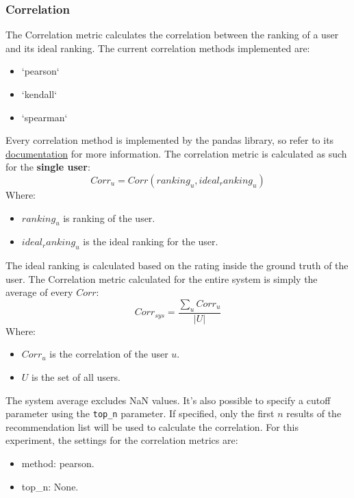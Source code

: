 \documentclass[11pt]{article}
\begin{document}
\subsubsection{Correlation}\label{subsubsec:corr}
The Correlation metric calculates the correlation between the ranking of a user and its ideal ranking.
The current correlation methods implemented are:
\begin{itemize}
    \item `pearson`
    \item `kendall`
    \item `spearman`
\end{itemize}
\hfill\break
\hfill\break
Every correlation method is implemented by the pandas library, so refer to its
\href{https://pandas.pydata.org/docs/reference/api/pandas.Series.corr.html}{documentation} for more information.
\hfill\break
\hfill\break
The correlation metric is calculated as such for the \textbf{single user}:
\hfill\break
\hfill\break
    \[
        Corr_u = Corr(ranking_u, ideal_ranking_u)
    \]
\hfill\break
\hfill\break
    Where:
\begin{itemize}
    \item $ranking_u$ is ranking of the user.
    \item $ideal_ranking_u$ is the ideal ranking for the user.
\end{itemize}
\hfill\break
\hfill\break
The ideal ranking is calculated based on the rating inside the ground truth of the user.
The Correlation metric calculated for the entire system is simply the average of every $Corr$:
\hfill\break
\hfill\break
    \[
        Corr_{sys} = \frac{\sum_{u} Corr_u}{|U|}
    \]
\hfill\break
\hfill\break
    Where:
\begin{itemize}
    \item $Corr_u$ is the correlation of the user $u$.
    \item $U$ is the set of all users.
\end{itemize}
\hfill\break
\hfill\break
The system average excludes NaN values.
It's also possible to specify a cutoff parameter using the \texttt{top\_n} parameter.
If specified, only the first $n$ results of the recommendation list will be used to calculate the correlation.
For this experiment, the settings for the correlation metrics are:
\begin{itemize}
    \item method: pearson.
    \item top\_n: None.
\end{itemize}
\hfill\break
\hfill\break
\end{document}
